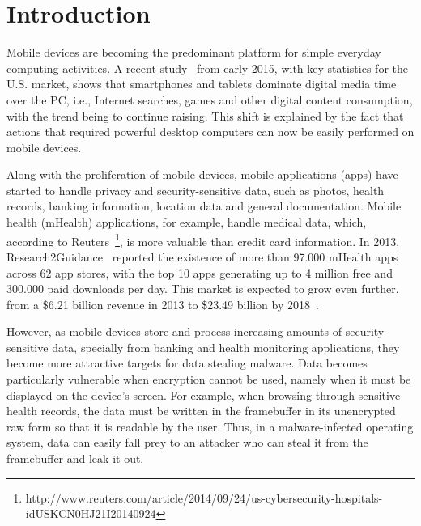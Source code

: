 
% 
% 
\section{Introduction}



Mobile devices are becoming the predominant platform for simple everyday computing activities.  A recent study~\cite{comscore} from early 2015, with key statistics for the U.S. market, shows that smartphones and tablets dominate digital media time over the \ac{PC}, i.e., Internet searches, games and other digital content consumption, with the trend being to continue raising. This shift is explained by the fact that actions that required powerful desktop computers can now be easily performed on mobile devices.

Along with the proliferation of mobile devices, mobile applications (apps) have started to handle privacy and security-sensitive data, such as photos, health records, banking information, location data and general documentation. Mobile health (mHealth) applications, for example, handle medical data, which, according to Reuters~\footnote{http://www.reuters.com/article/2014/09/24/us-cybersecurity-hospitals-idUSKCN0HJ21I20140924}, is more valuable than credit card information. In 2013, Research2Guidance~\cite{research2guidance} reported the existence of more than 97.000 mHealth apps across 62 app stores, with the top 10 apps generating up to 4 million free and 300.000 paid downloads per day. This market is expected to grow even further, from a \$6.21 billion revenue in 2013 to \$23.49 billion by 2018~\cite{marketsandmarkets}.

However, as mobile devices store and process increasing amounts of security sensitive data, specially from banking and health monitoring applications, they become more attractive targets for data stealing malware. Data becomes particularly vulnerable when encryption cannot be used, namely when it must be displayed on the device's screen. For example, when browsing through sensitive health records, the data must be written in the framebuffer in its unencrypted raw form so that it is readable by the user. Thus, in a malware-infected operating system, data can easily fall prey to an attacker who can steal it from the framebuffer and leak it out.

